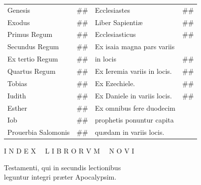 \documentclass[a5paper,10pt]{book}
\def\ae{æ}
\begin{document}
\begin{center}
\begin{tabular}{l r l r}
Genesis & \#\# & Ecclesiastes & \#\# \\
Exodus & \#\# & Liber Sapienti\ae & \#\# \\
Primus Regum & \#\# & Ecclesiasticus & \#\# \\
Secundus Regum & \#\# & Ex isaia magna pars variis & \\
Ex tertio Regum & \#\# & \quad in locis & \#\# \\
Quartus Regum & \#\# & Ex Ieremia variis in locis. & \#\# \\
Tobias & \#\# & Ex Ezechiele. & \#\# \\
Iudith & \#\# & Ex Daniele in variis locis. & \#\# \\
Esther & \#\# & Ex omnibus fere duodecim & \\
Iob & \#\# & \quad prophetis ponuntur capita & \\
Prouerbia Salomonis & \#\# & \quad qu\ae dam in variis locis. & \\%
\end{tabular}
\end{center}
\vspace{+1em}

\begin{center} \color{red} \large
I N D E X \ \ L I B R O R V M \ \ N O V I
\end{center}
\vspace{-1.5em}

\begin{center}
Testamenti, qui in secundis lectionibus\\
leguntur integri pr\ae ter Apocalypsim.
\end{center}
\end{document}
